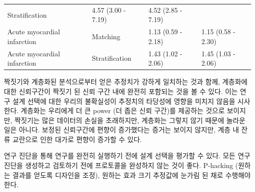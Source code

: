 \documentclass[11pt]{book}
\theoremstyle{definition}
\theoremstyle{definition}
\theoremstyle{definition}
\theoremstyle{remark}
\let\BeginKnitrBlock\begin \let\EndKnitrBlock\end
\begin{document}
\begin{longtable}[]{@{}llll@{}}
\begin{minipage}[t]{0.15\columnwidth}
Stratification\strut
\end{minipage} & \begin{minipage}[t]{0.17\columnwidth}\raggedright\strut
4.57 (3.00 - 7.19)\strut
\end{minipage} & \begin{minipage}[t]{0.17\columnwidth}\raggedright\strut
4.52 (2.85 - 7.19)\strut
\end{minipage}\tabularnewline
\begin{minipage}[t]{0.27\columnwidth}\raggedright\strut
Acute myocardial infarction\strut
\end{minipage} & \begin{minipage}[t]{0.15\columnwidth}\raggedright\strut
Matching\strut
\end{minipage} & \begin{minipage}[t]{0.17\columnwidth}\raggedright\strut
1.13 (0.59 - 2.18)\strut
\end{minipage} & \begin{minipage}[t]{0.17\columnwidth}\raggedright\strut
1.15 (0.58 - 2.30)\strut
\end{minipage}\tabularnewline
\begin{minipage}[t]{0.27\columnwidth}\raggedright\strut
Acute myocardial infarction\strut
\end{minipage} & \begin{minipage}[t]{0.15\columnwidth}\raggedright\strut
Stratification\strut
\end{minipage} & \begin{minipage}[t]{0.17\columnwidth}\raggedright\strut
1.43 (1.02 - 2.06)\strut
\end{minipage} & \begin{minipage}[t]{0.17\columnwidth}\raggedright\strut
1.45 (1.03 - 2.06)\strut
\end{minipage}\tabularnewline
\bottomrule
\end{longtable}

짝짓기와 계층화된 분석으로부터 얻은 추정치가 강하게 일치하는 것과 함께,
계층화에 대한 신뢰구간이 짝짓기 된 신뢰 구간 내에 완전히 포함되는 것을
볼 수 있다. 이는 연구 설계 선택에 대한 우리의 불확실성이 추정치의
타당성에 영향을 미치지 않음을 시사한다. 계층화는 우리에게 더 큰 power
(더 좁은 신뢰 구간)를 제공하는 것으로 보이지만, 짝짓기는 많은 데이터의
손실을 초래하지만, 계층화는 그렇지 않기 때문에 놀라운 일은 아니다.
보정된 신뢰구간에 편향이 증가했다는 증거는 보이지 않지만, 계층 내 잔류
교란으로 인한 대가로 편향이 증가할 수 있다.

\BeginKnitrBlock{rmdimportant}
연구 진단을 통해 연구를 완전히 실행하기 전에 설계 선택을 평가할 수 있다.
모든 연구 진단을 생성하고 검토하기 전에 프로토콜을 완성하지 않는 것이
좋다. P-hacking (원하는 결과를 얻도록 디자인을 조정), 원하는 효과 크기
추정값에 눈가림 된 채로 수행해야 한다.
\EndKnitrBlock{rmdimportant}
\end{document}
